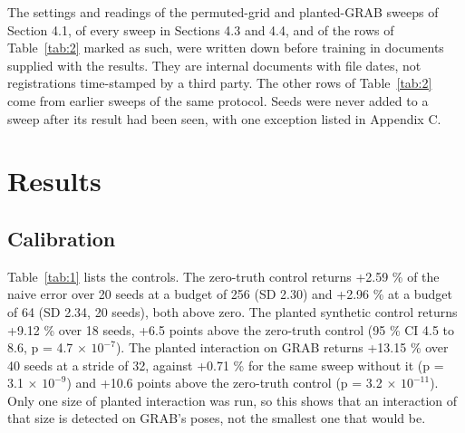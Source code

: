\documentclass[10pt]{article}
\begin{document}
The settings and readings of the permuted-grid and planted-GRAB sweeps of Section 4.1, of every sweep in Sections 4.3 and 4.4, and of the rows of Table~\ref{tab:2} marked as such, were written down before training in documents supplied with the results. They are internal documents with file dates, not registrations time-stamped by a third party. The other rows of Table~\ref{tab:2} come from earlier sweeps of the same protocol. Seeds were never added to a sweep after its result had been seen, with one exception listed in Appendix C.

\section{Results}

\subsection{Calibration}

Table~\ref{tab:1} lists the controls. The zero-truth control returns +2.59 \% of the naive error over 20 seeds at a budget of 256 (SD 2.30) and +2.96 \% at a budget of 64 (SD 2.34, 20 seeds), both above zero. The planted synthetic control returns +9.12 \% over 18 seeds, +6.5 points above the zero-truth control (95 \% CI 4.5 to 8.6, p = 4.7 $\times$ $10^{-7}$). The planted interaction on GRAB returns +13.15 \% over 40 seeds at a stride of 32, against +0.71 \% for the same sweep without it (p = 3.1 $\times$ $10^{-9}$) and +10.6 points above the zero-truth control (p = 3.2 $\times$ $10^{-11}$). Only one size of planted interaction was run, so this shows that an interaction of that size is detected on GRAB's poses, not the smallest one that would be.
\end{document}
